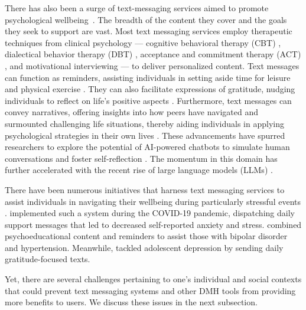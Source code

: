 There has also been a surge of text-messaging services aimed to promote psychological wellbeing~\cite{kretzschmar2019can, chikersal2020understanding, rathbone2017use, inkster2018empathy, morris2018towards, stowell2018designing, kornfield2022meeting, agyapong2020changes}. The breadth of the content they cover and the goals they seek to support are vast. Most text messaging services employ therapeutic techniques from clinical psychology — cognitive behavioral therapy (CBT) \cite{willson2019cognitive}, dialectical behavior therapy (DBT) \cite{linehan2014dbt}, acceptance and commitment therapy (ACT) \cite{hayes2004acceptance}, and motivational interviewing \cite{hettema2005motivational} — to deliver personalized content. Text messages can function as reminders, assisting individuals in setting aside time for leisure and physical exercise \cite{bhattacharjee2023investigating, figueroa2022daily}. They can also facilitate expressions of gratitude, nudging individuals to reflect on life's positive aspects \cite{bhattacharjee2022design}. Furthermore, text messages can convey narratives, offering insights into how peers have navigated and surmounted challenging life situations, thereby aiding individuals in applying psychological strategies in their own lives \cite{bhattacharjee2022kind}. These advancements have spurred researchers to explore the potential of AI-powered chatbots to simulate human conversations and foster self-reflection \cite{inkster2018empathy, kocielnik2018reflection, tielman2017should}. The momentum in this domain has further accelerated with the recent rise of large language models (LLMs) \cite{van2023global, kumar2022exploring}.

There have been numerous initiatives that harness text messaging services to assist individuals in navigating their wellbeing during particularly stressful events \cite{agyapong2020changes, levin2019outcomes, arps2018promoting, nobles2018identification, bhattacharjee2023investigating, agyapong2022text4hope, agyapong2022text4hope}. \citet{agyapong2022text4hope} implemented such a system during the COVID-19 pandemic, dispatching daily support messages that led to decreased self-reported anxiety and stress. \citet{levin2019outcomes} combined psychoeducational content and reminders to assist those with bipolar disorder and hypertension. Meanwhile, \citet{arps2018promoting} tackled adolescent depression by sending daily gratitude-focused texts.

Yet, there are several challenges pertaining to one's individual and social contexts that could prevent text messaging systems and other DMH tools from providing more benefits to users. We discuss these issues in the next subsection.


